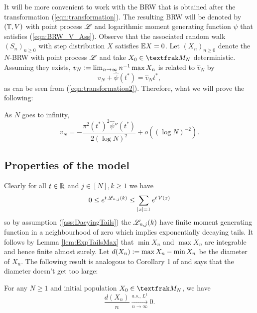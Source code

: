 It will be more convenient to work with the BRW that is obtained after the transformation (\ref{eqn:transformation}). The resulting BRW will be denoted by $(\mathbb{T}, V)$ with point process $\mathscr{L}$ and logarithmic moment generating function $\psi$ that satisfies (\ref{eqn:BRW_V_Ass}). Observe that the associated random walk $(S_n)_{n \geq 0}$ with step distribution $X$ satisfies $\mathbb{E} X = 0$. Let $(X_n)_{n \geq 0}$ denote the $N$-BRW with point process $\mathscr{L}$ and take $X_0 \in \frak{M}_N$ deterministic. Assuming they exists, $v_N \vcentcolon= \lim_{n \to \infty} n^{-1} \max X_n$ is related to $\hat{v}_N$ by 
\begin{equation}\label{eqn:speed_relation}
v_N + \widehat{\psi}(t^*)= \hat{v}_N t^*, 
\end{equation}
as can be seen from (\ref{eqn:transformation2}). Therefore, what we will prove the following:
\begin{theorem} \label{thm:ExpTails_BrunDer}
As $N$ goes to infinity, 
\begin{equation}\nonumber
v_N = - \frac{\pi^2 (t^*)^2 \widehat{\psi}''(t^*)} {2 (\log N)^2} + o((\log N)^{-2}). 
\end{equation}
\end{theorem}

\subsection{Properties of the model}
Clearly for all $t\in\mathbb{R}$ and $j \in [N], k \geq 1$ we have 
\begin{equation}\label{eqn:ExpTailsMaxIntegrable}
0 \leq e^{t\, \mathscr{L}_{n,j}(k)} \leq \sum_{|x|=1} e^{t\, V(x)}
\end{equation} so by assumption (\ref{ass:DacyingTails}) the $\mathscr{L}_{n,j}(k)$ have finite moment generating function in a neighbourhood of zero which implies exponentially decaying tails. It follows by Lemma \ref{lem:ExpTailsMax} that $\min X_n$ and $\max X_n$ are integrable and hence finite almost surely. Let $d(X_n) \vcentcolon= \max X_n - \min X_n$ be the diameter of $X_n$. The following result is analogous to Corollary 1 of \cite{exp_tails} and says that the diameter doesn't get too large:

\begin{proposition}\label{prop:diameter}
For any $N \geq 1$ and initial population $X_0 \in \frak{M}_N$, we have 
\begin{equation}\nonumber
\frac{d(X_n)}{n} \xrightarrow[n \to \infty]{a.s.,\, L^1} 0. 
\end{equation}
\end{proposition}

